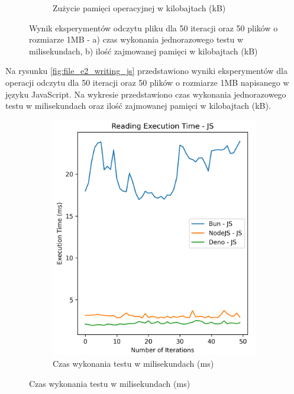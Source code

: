 \begin{figure}[H]
\begin{subfigure}[b]{0.4\textwidth}
    \caption{Zużycie pamięci operacyjnej w kilobajtach (kB)}
    \label{fig:file_e2_reading_js_memory}
  \end{subfigure}
  \caption{Wynik eksperymentów odczytu pliku dla 50 iteracji oraz 50 plików o rozmiarze 1MB - a) czas wykonania jednorazowego testu w milisekundach, b) ilość zajmowanej pamięci w kilobajtach (kB)}
  \label{fig:file_e2_reading_js}
\end{figure}

Na rysunku \ref{fig:file_e2_writing_js} przedstawiono wyniki eksperymentów dla operacji odczytu dla 50 iteracji oraz 50 plików o rozmiarze 1MB napisanego w języku JavaScript. Na wykresie przedstawiono czas wykonania jednorazowego testu w milisekundach oraz ilość zajmowanej pamięci w kilobajtach (kB).

\begin{figure}[H]
  \centering
  \begin{subfigure}[b]{0.4\textwidth}
    \centering
    \includegraphics[width=\textwidth]{Figures/files/files_writing_50_2000_50_js_time.png}
    \caption{Czas wykonania testu w milisekundach (ms)}
    \label{fig:file_e2_writing_js_time}
  \end{subfigure}

\end{figure}
